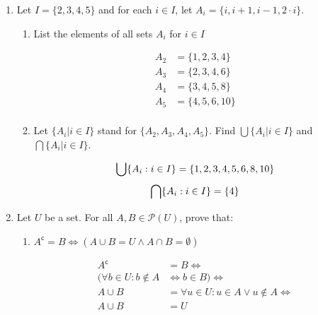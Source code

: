 \documentclass[10pt,\jkfside,a4paper]{article}
\begin{document}
\begin{enumerate}
\item Let $I = \{2, 3, 4, 5\}$ and for each $i \in I$, let $A_i = \{i, i + 1, i - 1, 2\cdot i\}$.

\begin{enumerate}

\item List the elements of all sets $A_i$ for $i \in I$

\begin{equation}
\begin{split}
A_2 &= \{1, 2, 3, 4\}\\
A_3 &= \{2, 3, 4, 6\}\\
A_4 &= \{3, 4, 5, 8\}\\
A_5 &= \{4, 5, 6, 10\}\\
\end{split}
\end{equation}

\item Let $\{A_i| i \in I\}$ stand for $\{A_2, A_3, A_4, A_5\}$. Find $\bigcup\{A_i| i \in I\}$ and $\bigcap\{A_i| i \in I\}$.

\begin{equation}
\bigcup\{A_i: i \in I\} = \{1, 2, 3, 4, 5, 6, 8, 10\}\\
\end{equation}
\begin{equation}
\bigcap\{A_i:i \in I\} = \{4\}\\
\end{equation}

\end{enumerate}

\item Let $U$ be a set. For all $A, B \in \mathcal{P}(U)$, prove that:

\begin{enumerate}

\item $A^\mathsf{c} = B \Longleftrightarrow (A \cup B = U \wedge A \cap B = \emptyset)$

\begin{equation}
\begin{split}
A^\mathsf{c} &= B \Longleftrightarrow\\
(\forall b \in U: b \notin A &\Longleftrightarrow b \in B) \Longleftrightarrow\\
A \cup B &= \forall u \in U: u \in A \vee u \notin A \Longleftrightarrow\\
A \cup B &= U\\
\end{split}
\end{equation}


\end{enumerate}
\end{enumerate}
\end{document}
